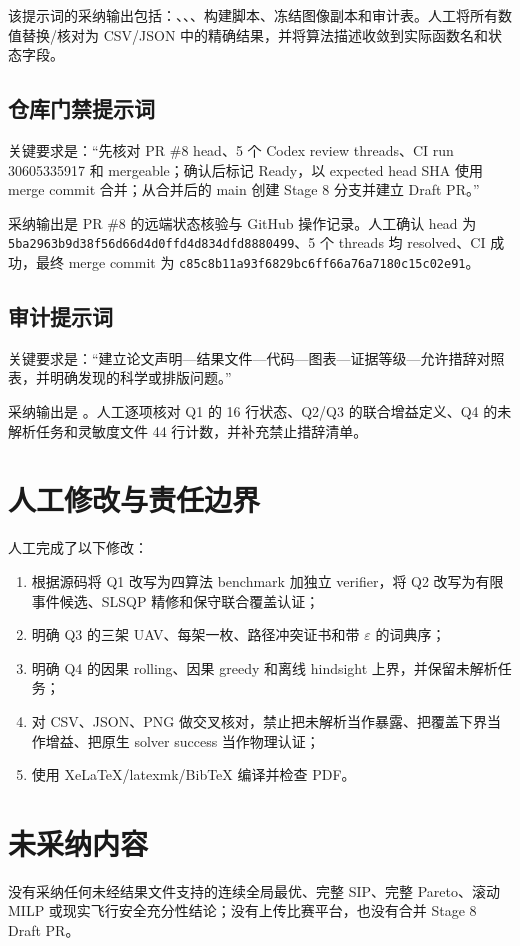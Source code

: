 \documentclass[UTF8,a4paper,12pt]{ctexart}
\begin{document}
该提示词的采纳输出包括：、、、构建脚本、冻结图像副本和审计表。人工将所有数值替换/核对为 CSV/JSON 中的精确结果，并将算法描述收敛到实际函数名和状态字段。

\subsection{仓库门禁提示词}

关键要求是：“先核对 PR \#8 head、5 个 Codex review threads、CI run 30605335917 和 mergeable；确认后标记 Ready，以 expected head SHA 使用 merge commit 合并；从合并后的 main 创建 Stage 8 分支并建立 Draft PR。”

采纳输出是 PR \#8 的远端状态核验与 GitHub 操作记录。人工确认 head 为 \texttt{5ba2963b9d38f56d66d4d0ffd4d834dfd8880499}、5 个 threads 均 resolved、CI 成功，最终 merge commit 为 \texttt{c85c8b11a93f6829bc6ff66a76a7180c15c02e91}。

\subsection{审计提示词}

关键要求是：“建立论文声明—结果文件—代码—图表—证据等级—允许措辞对照表，并明确发现的科学或排版问题。”

采纳输出是 。人工逐项核对 Q1 的 16 行状态、Q2/Q3 的联合增益定义、Q4 的未解析任务和灵敏度文件 44 行计数，并补充禁止措辞清单。

\section{人工修改与责任边界}

人工完成了以下修改：
\begin{enumerate}[label=\arabic*.]
  \item 根据源码将 Q1 改写为四算法 benchmark 加独立 verifier，将 Q2 改写为有限事件候选、SLSQP 精修和保守联合覆盖认证；
  \item 明确 Q3 的三架 UAV、每架一枚、路径冲突证书和带 $\varepsilon$ 的词典序；
  \item 明确 Q4 的因果 rolling、因果 greedy 和离线 hindsight 上界，并保留未解析任务；
  \item 对 CSV、JSON、PNG 做交叉核对，禁止把未解析当作暴露、把覆盖下界当作增益、把原生 solver success 当作物理认证；
  \item 使用 XeLaTeX/latexmk/BibTeX 编译并检查 PDF。
\end{enumerate}

\section{未采纳内容}

没有采纳任何未经结果文件支持的连续全局最优、完整 SIP、完整 Pareto、滚动 MILP 或现实飞行安全充分性结论；没有上传比赛平台，也没有合并 Stage 8 Draft PR。
\end{document}

